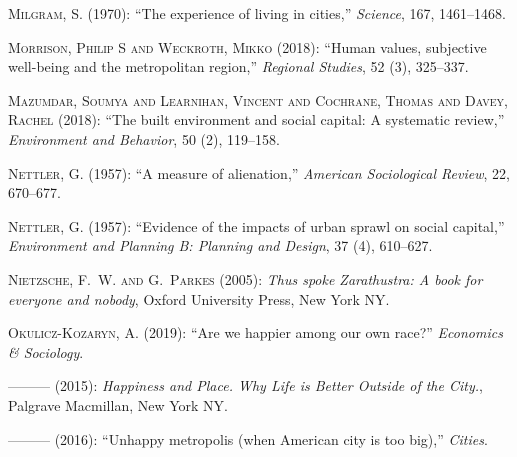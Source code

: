 \documentclass[11pt, letterpaper]{article}
\begin{document}
\begin{spacing}{1.4}
\begin{thebibliography}{92}
\textsc{Milgram, S.} (1970): \enquote{The experience of living in cities,}
  \emph{Science}, 167, 1461--1468.

\textsc{Morrison, Philip S and Weckroth, Mikko} (2018): \enquote{Human values, subjective well-being and the metropolitan region,}
  \emph{Regional Studies}, 52 (3), 325--337.
  
\textsc{Mazumdar, Soumya and Learnihan, Vincent and Cochrane, Thomas and Davey, Rachel} (2018): \enquote{The built environment and social capital: A systematic review,}
  \emph{Environment and Behavior}, 50 (2), 119--158.
  
\textsc{Nettler, G.} (1957): \enquote{A measure of alienation,} \emph{American
  Sociological Review}, 22, 670--677.
  
\textsc{Nettler, G.} (1957): \enquote{Evidence of the impacts of urban sprawl on social capital,} \emph{Environment and Planning B: Planning and Design}, 37 (4), 610--627.

\textsc{Nietzsche, F.~W. and G.~Parkes} (2005): \emph{Thus spoke Zarathustra: A
  book for everyone and nobody}, Oxford University Press, New York NY.

\textsc{Okulicz-Kozaryn, A.} (2019{}): \enquote{Are we happier
  among our own race?} \emph{Economics \& Sociology}.

---\hspace{-.1pt}---\hspace{-.1pt}--- (2015{}): \emph{Happiness and
  Place. Why Life is Better Outside of the City.}, Palgrave Macmillan, New York
  NY.

---\hspace{-.1pt}---\hspace{-.1pt}--- (2016): \enquote{Unhappy metropolis (when
  American city is too big),} \emph{Cities}.


\end{thebibliography}
\end{spacing}
\end{document}
